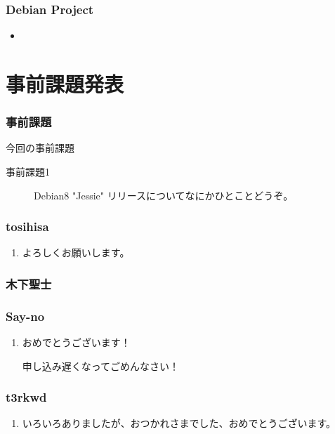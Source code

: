 \documentclass[cjk,dvipdfmx,10pt,compress,%
hyperref={bookmarks=true,bookmarksnumbered=true,bookmarksopen=false,%
colorlinks=false,%
pdftitle={第 97 回 関西 Debian 勉強会},%
pdfauthor={倉敷・のがた・佐々木・かわだ},%
pdfsubject={資料},%
}]{beamer}
\begin{document}
\begin{frame}[fragile]
  \frametitle{Debian Project}
  \begin{itemize}
  \item 
  \end{itemize}
\end{frame}


\section{事前課題発表}


\begin{frame}[fragile]
  \frametitle{事前課題}
  \begin{block}{今回の事前課題}
    \begin{description}
    \item[事前課題1]
      Debian8 "Jessie" リリースについてなにかひとことどうぞ。
    \end{description}
  \end{block}
\end{frame}


\begin{frame}
  \frametitle{ tosihisa }
  \begin{enumerate}
  \item よろしくお願いします。
  \end{enumerate}
\end{frame}

\begin{frame}
  \frametitle{ 木下聖士 }
\end{frame}

\begin{frame}
  \frametitle{ Say-no }
  \begin{enumerate}
  \item おめでとうございます！ 

    申し込み遅くなってごめんなさい！
  \end{enumerate}
\end{frame}

\begin{frame}
  \frametitle{ t3rkwd }
  \begin{enumerate}
  \item いろいろありましたが、おつかれさまでした、おめでとうございます。
  \end{enumerate}
\end{frame}
\end{document}
